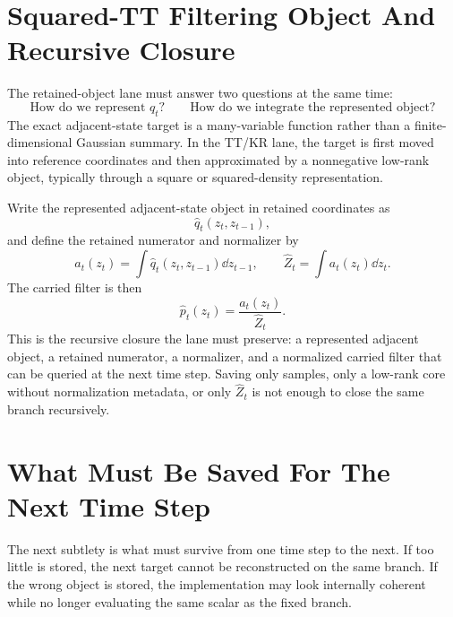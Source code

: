 \section{Squared-TT Filtering Object And Recursive Closure}
\label{sec:bf-hd-squared-tt-closure}

The retained-object lane must answer two questions at the same time:
\begin{equation}
  \text{How do we represent } q_t?
  \qquad
  \text{How do we integrate the represented object?}
  \label{eq:bf-hd-squared-tt-two-questions}
\end{equation}
The exact adjacent-state target is a many-variable function rather than a
finite-dimensional Gaussian summary.  In the TT/KR lane, the target is first
moved into reference coordinates and then approximated by a nonnegative
low-rank object, typically through a square or squared-density representation.

Write the represented adjacent-state object in retained coordinates as
\begin{equation}
  \widehat q_t(z_t,z_{t-1}),
  \label{eq:bf-hd-squared-tt-adjacent-object}
\end{equation}
and define the retained numerator and normalizer by
\begin{equation}
  a_t(z_t)=\int \widehat q_t(z_t,z_{t-1})\dd z_{t-1},
  \qquad
  \widehat Z_t=\int a_t(z_t)\dd z_t.
  \label{eq:bf-hd-squared-tt-retained-numerator}
\end{equation}
The carried filter is then
\begin{equation}
  \widehat p_t(z_t)=\frac{a_t(z_t)}{\widehat Z_t}.
  \label{eq:bf-hd-squared-tt-carried-filter}
\end{equation}
This is the recursive closure the lane must preserve: a represented adjacent
object, a retained numerator, a normalizer, and a normalized carried filter that
can be queried at the next time step.  Saving only samples, only a low-rank core
without normalization metadata, or only \(\widehat Z_t\) is not enough to close
the same branch recursively.

\section{What Must Be Saved For The Next Time Step}
\label{sec:bf-hd-squared-tt-stored-fields}

The next subtlety is what must survive from one time step to the next.  If too
little is stored, the next target cannot be reconstructed on the same branch.  If
the wrong object is stored, the implementation may look internally coherent while
no longer evaluating the same scalar as the fixed branch.

